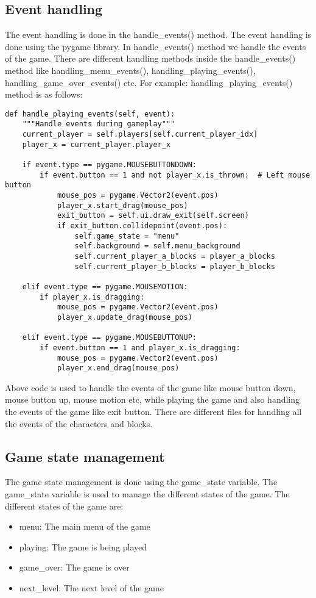 \documentclass[12pt]{article}
\begin{document}
\subsection{Event handling}
The event handling is done in the handle\_events() method. The event handling is done using the pygame library.
In handle\_events() method we handle the events of the game. There are different handling methods inside the handle\_events() method
like handling\_menu\_events(), handling\_playing\_events(), handling\_game\_over\_events() etc.
For example: handling\_playing\_events() method is as follows:

\begin{verbatim}
def handle_playing_events(self, event):
    """Handle events during gameplay"""
    current_player = self.players[self.current_player_idx]
    player_x = current_player.player_x
    
    if event.type == pygame.MOUSEBUTTONDOWN:
        if event.button == 1 and not player_x.is_thrown:  # Left mouse button
            mouse_pos = pygame.Vector2(event.pos)
            player_x.start_drag(mouse_pos)
            exit_button = self.ui.draw_exit(self.screen)
            if exit_button.collidepoint(event.pos):
                self.game_state = "menu"
                self.background = self.menu_background
                self.current_player_a_blocks = player_a_blocks
                self.current_player_b_blocks = player_b_blocks
    
    elif event.type == pygame.MOUSEMOTION:
        if player_x.is_dragging:
            mouse_pos = pygame.Vector2(event.pos)
            player_x.update_drag(mouse_pos)
    
    elif event.type == pygame.MOUSEBUTTONUP:
        if event.button == 1 and player_x.is_dragging:
            mouse_pos = pygame.Vector2(event.pos)
            player_x.end_drag(mouse_pos)
\end{verbatim}

Above code is used to handle the events of the game like mouse button down, mouse button up, mouse motion etc, while playing the game 
and also handling the events of the game like exit button.
There are different files for handling all the events of the characters and blocks.

\subsection{Game state management}
The game state management is done using the game\_state variable. The game\_state variable is used to manage the different states of the game. The different states of the game are:
\begin{itemize}
    \item menu: The main menu of the game
    \item playing: The game is being played
    \item game\_over: The game is over
    \item next\_level: The next level of the game
\end{itemize}
\end{document}
